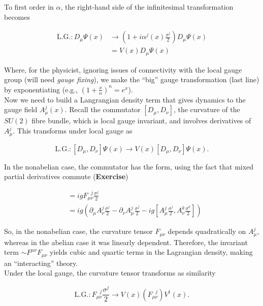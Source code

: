 \noindent To first order in $\alpha$, the right-hand side of the infinitesimal transformation becomes

\begin{align}
\text{L.G.}: D_\mu \Psi (x) &\rightarrow \left( 1 + i \alpha^j (x) \frac{\sigma^j}{2} \right) D_\mu \Psi (x) \\
&= V(x) D_\mu \Psi (x)
\end{align}

\noindent Where, for the physicist, ignoring issues of connectivity with the local gauge group (will need \textit{gauge fixing}), we make the ``big'' gauge transformation (last line) by exponentiating (e.g., $(1+\frac{x}{n})^n = e^x$). \\

\noindent Now we need to build a Langrangian density term that gives dynamics to the gauge field $A^j_\mu (x)$. Recall the commutator $[D_\mu, D_\nu]$, the curvature of the $SU(2)$ fibre bundle, which is local gauge invariant, and involves derivatives of $A_\mu^j$. This transforms under local gauge as

\begin{equation}
\text{L.G.}: [D_\mu, D_\nu] \Psi (x) \rightarrow V(x) [D_\mu, D_\nu] \Psi (x).
\end{equation}

\noindent In the nonabelian case, the commutator has the form, using the fact that mixed partial derivatives commute (\textbf{Exercise})

\begin{align}
[ D_\mu, D_\nu] &= i g F_{\mu\nu}^{\,\,\,\,j} \frac{\sigma^j}{2} \\
&= ig \left( \partial_\mu A_\nu^j \frac{\sigma^j}{2} - \partial_\nu A_\mu^j \frac{\sigma^j}{2} - i g \left[ A_\mu^j \frac{\sigma^j}{2}, A_\nu^k \frac{\sigma^k}{2} \right] \right)
\end{align}

\noindent So, in the nonabelian case, the curvature tensor $F_{\mu\nu}$ depends quadratically on $A_\mu^j$, whereas in the abelian case it was linearly dependent. Therefore, the invariant term $\sim F^{\mu\nu}F_{\mu\nu}$ yields cubic and quartic terms in the Lagrangian density, making an ``interacting'' theory. \\

\noindent Under the local gauge, the curvature tensor transforms as similarity

\begin{equation}
\text{L.G.}: F_{\mu\nu}^{\,\,\,\,j} \frac{\sigma^j}{2} \rightarrow V(x) (F_{\mu\nu}^{\,\,\,\,j}) V^\dagger (x).
\end{equation}

